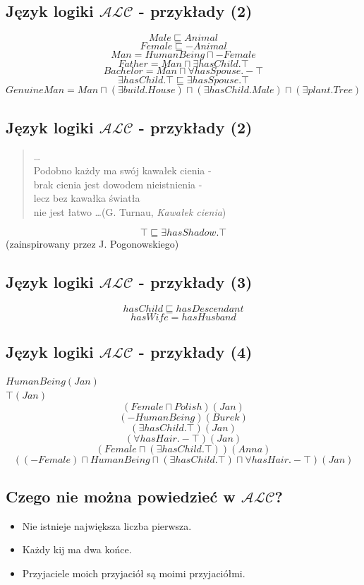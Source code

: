 \documentclass[12pt]{article}
\begin{document}
\subsection{Język logiki $\mathcal{ALC}$ - przykłady (2)}
%
$$Male \sqsubseteq Animal$$
%
$$Female \sqsubseteq - Animal$$
%
$$Man = HumanBeing \sqcap - Female$$ 
%
$$Father = Man \sqcap \exists hasChild . \top$$
%
$$Bachelor = Man \sqcap \forall hasSpouse . - \top$$
%
$$\exists hasChild . \top \sqsubseteq \exists hasSpouse . \top$$
%
$$GenuineMan = Man \sqcap (\exists build . House) \sqcap (\exists hasChild . Male) \sqcap (\exists plant .Tree)$$
%


\subsection{Język logiki $\mathcal{ALC}$ - przykłady (2)}
%
\begin{quote}
\dots\\
Podobno każdy ma swój kawałek cienia - \\
brak cienia jest dowodem nieistnienia - \\
lecz bez kawałka światła \\
nie jest łatwo \dots (G. Turnau, \emph{Kawałek cienia})
\end{quote}
%
$$\top \sqsubseteq \exists hasShadow . \top$$
(zainspirowany przez J. Pogonowskiego) \\
%

\subsection{Język logiki $\mathcal{ALC}$ - przykłady (3)}
%
$$hasChild \sqsubseteq hasDescendant$$
%
$$hasWife = hasHusband$$
%

\subsection{Język logiki $\mathcal{ALC}$ - przykłady (4)}
%
$HumanBeing(Jan)$\\
%
$\top(Jan)$\\
%
$$(Female \sqcap Polish)(Jan)$$
%
$$(- HumanBeing)(Burek)$$
%
$$(\exists hasChild . \top)(Jan)$$
%
$$(\forall hasHair . - \top)(Jan)$$
%
$$(Female \sqcap (\exists hasChild . \top))(Anna)$$
%
$$((- Female) \sqcap HumanBeing \sqcap (\exists hasChild . \top) \sqcap \forall hasHair . - \top)(Jan)$$
%

\subsection{Czego nie można powiedzieć w $\mathcal{ALC}$?}
%
\begin{itemize}
	\item Nie istnieje największa liczba pierwsza.
	\item Każdy kij ma dwa końce.
	\item Przyjaciele moich przyjaciół są moimi przyjaciółmi.
\end{itemize}
%
\end{document}
